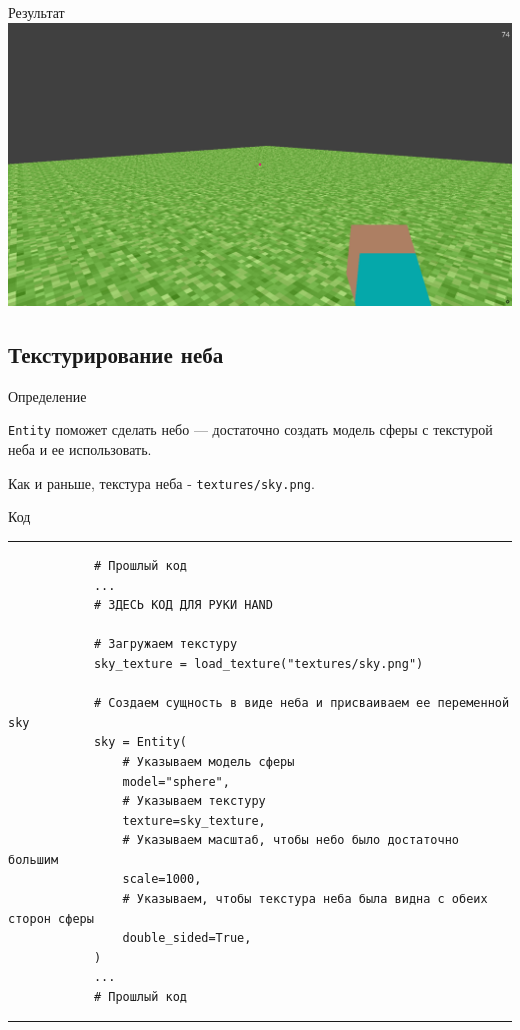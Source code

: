 \documentclass[handout]{beamer}
\begin{document}
    \begin{frame}{Результат}
        \includegraphics[width=\textwidth]{img/5.png}
    \end{frame}


    \subsection{Текстурирование неба}
    \begin{frame}{Определение}
        \begin{justify}
            \texttt{Entity} поможет сделать небо — достаточно создать модель сферы с текстурой неба и ее использовать.
            
            Как и раньше, текстура неба - \texttt{textures/sky.png}.
        \end{justify}
    \end{frame}

    \begin{frame}[fragile]{Код}
        \scriptsize
        \rule{\textwidth}{1pt}
        \begin{verbatim}
            # Прошлый код
            ...
            # ЗДЕСЬ КОД ДЛЯ РУКИ HAND
            
            # Загружаем текстуру
            sky_texture = load_texture("textures/sky.png")
            
            # Создаем сущность в виде неба и присваиваем ее переменной sky
            sky = Entity(
            	# Указываем модель сферы
            	model="sphere",
            	# Указываем текстуру
            	texture=sky_texture,
            	# Указываем масштаб, чтобы небо было достаточно большим
            	scale=1000,
            	# Указываем, чтобы текстура неба была видна с обеих сторон сферы
            	double_sided=True,
            )
            ...
            # Прошлый код
        \end{verbatim}
        \rule{\textwidth}{1pt}
    \end{frame}
    
\end{document}
